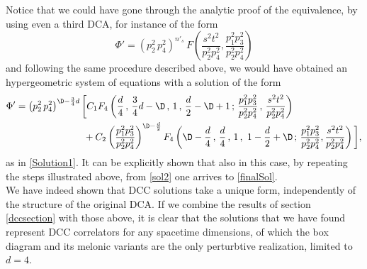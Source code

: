 \documentclass[a4paper,11pt,openright,twoside]{book}
\numberwithin{equation}{section}
\begin{document}
{Notice that we could have gone through the analytic proof of the equivalence, by using even a third DCA, for instance of the form 
\begin{equation}
	\Phi'=\left(p_2^2\,p_4^2\right)^{n'_s}\,F\left(\frac{s^2t^2}{p_2^2p_4^2},\frac{p_1^2p_3^2}{p_2^2p_4^2}\right)
\end{equation}
and following the same procedure described above, we would have obtained an hypergeometric system of equations with a solution of the form
\begin{align}
	\label{sol2}
	\Phi'&=\left(p_2^2\,p_4^2\right)^{\D-\frac{3}{4}d}\bigg[C_1 F_4\left(\frac{d}{4}\,,\,\frac{3}{4}d-\D\, ,\,1\,,\,\frac{d}{2}-\D+1\,;\,\frac{p_1^2p_3^2}{p_2^2p_4^2}\, ,\,\frac{s^2t^2}{p_2^2p_4^2}\right)\notag\\
	&\hspace{2.5cm}+C_2\left(\frac{p_1^2p_3^2}{p_2^2p_4^2}\right)^{\D-\frac{d}{2}} F_4\left(\D-\frac{d}{4}\,,\,\frac{d}{4}\, ,\,1\,,\,\,1-\frac{d}{2}+\D\,;\,\frac{p_1^2p_3^2}{p_2^2p_4^2},\frac{s^2t^2}{p_2^2p_4^2}\right)\bigg],
\end{align}
as in \eqref{Solution1}. It can be explicitly shown that also in this case, by repeating the steps illustrated above, from \eqref{sol2} one arrives to \eqref{finalSol}. \\
We have indeed shown that DCC solutions take a unique form, independently of the structure of the original DCA. If we combine the results of section \ref{dccsection} with those above, it is clear that the solutions that we have found represent DCC correlators for any spacetime dimensions, of which the box diagram and its melonic variants 
are the only perturbtive realization, limited to $d=4$. 

}
\end{document}
